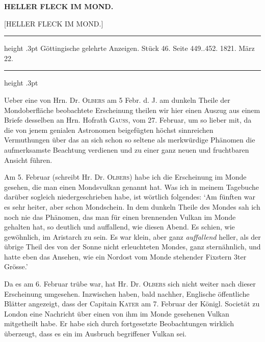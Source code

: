\clearpage
\thispagestyle{empty}
\noindent{}%
%
\parbox[t]{\dimexpr\linewidth-24mm\relax}{\centering\footnotesize\bfseries HELLER FLECK IM MOND.\par}%
\makebox[12mm][r]{}\par\nobreak\medskip
{}
\begin{center}
{\large [HELLER FLECK IM MOND.]}
\end{center}

\begin{center}\parbox{.86\linewidth}{\centering\small
\hrule height .3pt\relax\vspace{2.5pt}
Göttingische gelehrte Anzeigen. Stück 46. Seite 449..452. 1821. März 22.\par
\vspace{2.5pt}\hrule height .3pt\relax
}\end{center}

Ueber eine von Hrn. Dr. \textsc{Olbers} am 5 Febr. d. J. am dunkeln Theile der
Mondoberfläche beobachtete Erscheinung theilen wir hier einen Auszug aus einem Briefe
desselben an Hrn. Hofrath \textsc{Gauss}, vom 27. Februar, um so lieber mit, da die von
jenem genialen Astronomen beigefügten höchst sinnreichen Vermuthungen über das an sich
schon so seltene als merkwürdige Phänomen die aufmerksamste Beachtung verdienen und zu
einer ganz neuen und fruchtbaren Ansicht führen.

Am 5. Februar (schreibt Hr. Dr. \textsc{Olbers}) habe ich die Erscheinung im Monde
gesehen, die man einen Mondsvulkan genannt hat. Was ich in meinem Tagebuche darüber
sogleich niedergeschrieben habe, ist wörtlich folgendes: `Am fünften war es sehr heiter,
aber schon Mondschein. In dem dunkeln Theile des Mondes sah ich noch nie das Phänomen,
das man für einen brennenden Vulkan im Monde gehalten hat, so deutlich und auffallend,
wie diesen Abend. Es schien, wie gewöhnlich, im Aristarch zu sein. Es war klein, aber
ganz \emph{auffallend} heller, als der übrige Theil des von der Sonne nicht erleuchteten
Mondes, ganz sternähnlich, und hatte eben das Ansehen, wie ein Nordost vom Monde
stehender Fixstern 3ter Grösse.'

Da es am 6. Februar trübe war, hat Hr. Dr. \textsc{Olbers} sich nicht weiter nach dieser
Erscheinung umgesehen. Inzwischen haben, bald nachher, Englische öffentliche Blätter
angezeigt, dass der Capitain \textsc{Kater} am 7. Februar der Königl. Societät zu London
eine Nachricht über einen von ihm im Monde gesehenen Vulkan mitgetheilt habe. Er habe
sich durch fortgesetzte Beobachtungen wirklich überzeugt, dass es ein im Ausbruch
begriffener Vulkan sei.

